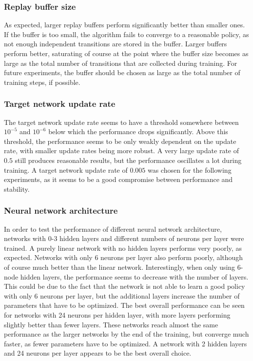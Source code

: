 \subsubsection{Replay buffer size}
As expected, larger replay buffers perform significantly better than smaller ones. If the buffer is too small, the algorithm fails to converge to a reasonable policy, as not enough independent transitions are stored in the buffer. Larger buffers perform better, saturating of course at the point where the buffer size becomes as large as the total number of transitions that are collected during training. For future experiments, the buffer should be chosen as large as the total number of training steps, if possible. 

\subsubsection{Target network update rate}
The target network update rate seems to have a threshold somewhere between $10^{-5}$ and $10^{-6}$ below which the performance drops significantly. Above this threshold, the performance seems to be only weakly dependent on the update rate, with smaller update rates being more robust. A very large update rate of $0.5$ still produces reasonable results, but the performance oscillates a lot during training. A target network update rate of $0.005$ was chosen for the following experiments, as it seems to be a good compromise between performance and stability.

\subsubsection{Neural network architecture}
In order to test the performance of different neural network architecture, networks with 0-3 hidden layers and different numbers of neurons per layer were trained. A purely linear network with no hidden layers performs very poorly, as expected. Networks with only 6 neurons per layer also perform poorly, although of course much better than the linear network. Interestingly, when only using 6-node hidden layers, the performance seems to decrease with the number of layers. This could be due to the fact that the network is not able to learn a good policy with only 6 neurons per layer, but the additional layers increase the number of parameters that have to be optimized. The best overall performance can be seen for networks with 24 neurons per hidden layer, with more layers performing slightly better than fewer layers. These networks reach almost the same performance as the larger networks by the end of the training, but converge much faster, as fewer parameters have to be optimized. A network with 2 hidden layers and 24 neurons per layer appears to be the best overall choice.

